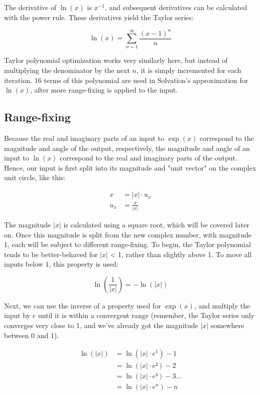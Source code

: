 \documentclass[10pt]{article}
\begin{document}
\begin{multicols}{2}
The derivative of $\ln(x)$ is $x^{-1}$, and subsequent derivatives can be calculated with the power rule. These derivatives yield the Taylor series:

\[
    \ln(x) = ∑_{n=1}^∞ \frac{(x - 1)^n}{n}
\]

Taylor polynomial optimization works very similarly here, but instead of multiplying the denominator by the next $n$, it is simply incremented for each iteration. 16 terms of this polynomial are used in Solvation's approximation for $\ln(x)$, after more range-fixing is applied to the input.

\subsection{Range-fixing}

Because the real and imaginary parts of an input to $\exp(x)$ correspond to the magnitude and angle of the output, respectively, the magnitude and angle of an input to $\ln(x)$ correspond to the real and imaginary parts of the output. Hence, our input is first split into its magnitude and "unit vector" on the complex unit circle, like this:

\begin{align*}
    x &= |x| · u_x \\
    u_x &= \frac{x}{|x|}
\end{align*}

The magnitude $|x|$ is calculated using a square root, which will be covered later on. Once this magnitude is split from the new complex number, with magnitude 1, each will be subject to different range-fixing. To begin, the Taylor polynomial tends to be better-behaved for $|x|$ < 1, rather than slightly above 1. To move all inputs below 1, this property is used:

\[
    \ln(\frac{1}{|x|}) = -\ln(|x|)
\]

Next, we can use the inverse of a property used for $\exp(x)$, and multiply the input by $e$ until it is within a convergent range (remember, the Taylor series only converges very close to 1, and we've already got the magnitude $|x|$ somewhere between 0 and 1).

\begin{align*}
    \ln(|x|) &= \ln(|x| · e^1) - 1 \\
    &= \ln(|x| · e²) - 2 \\
    &= \ln(|x| · e³) - 3 ... \\
    &= \ln(|x| · e^n) - n \\
\end{align*}


\end{multicols}
\end{document}
